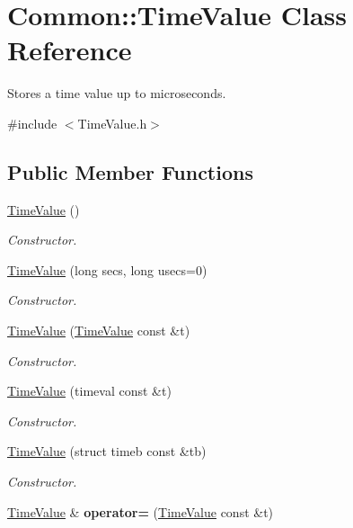\hypertarget{class_common_1_1_time_value}{\section{Common\-:\-:Time\-Value Class Reference}
\label{class_common_1_1_time_value}
}


Stores a time value up to microseconds.  




{\ttfamily \#include $<$Time\-Value.\-h$>$}

\subsection*{Public Member Functions}
\begin{DoxyCompactItemize}
\item 
\hyperlink{class_common_1_1_time_value_aa85538c3483db43375221b8598094348}{Time\-Value} ()
\begin{DoxyCompactList}\small\item\em Constructor. \end{DoxyCompactList}\item 
\hyperlink{class_common_1_1_time_value_a869fbb26691f1509438b425ffe1fbe26}{Time\-Value} (long secs, long usecs=0)
\begin{DoxyCompactList}\small\item\em Constructor. \end{DoxyCompactList}\item 
\hyperlink{class_common_1_1_time_value_a13d279540289163e9db13c832cda10cc}{Time\-Value} (\hyperlink{class_common_1_1_time_value}{Time\-Value} const \&t)
\begin{DoxyCompactList}\small\item\em Constructor. \end{DoxyCompactList}\item 
\hyperlink{class_common_1_1_time_value_af461d53d4da630ba62cb5a9df0991045}{Time\-Value} (timeval const \&t)
\begin{DoxyCompactList}\small\item\em Constructor. \end{DoxyCompactList}\item 
\hyperlink{class_common_1_1_time_value_a37f682d54fb449160837e8d3fa0d7a39}{Time\-Value} (struct timeb const \&tb)
\begin{DoxyCompactList}\small\item\em Constructor. \end{DoxyCompactList}\item 
\hypertarget{class_common_1_1_time_value_ad69d5bc4e4a289148c46406fddc5894d}{\hyperlink{class_common_1_1_time_value}{Time\-Value} \& {\bfseries operator=} (\hyperlink{class_common_1_1_time_value}{Time\-Value} const \&t)}\label{class_common_1_1_time_value_ad69d5bc4e4a289148c46406fddc5894d}


\end{DoxyCompactItemize}
